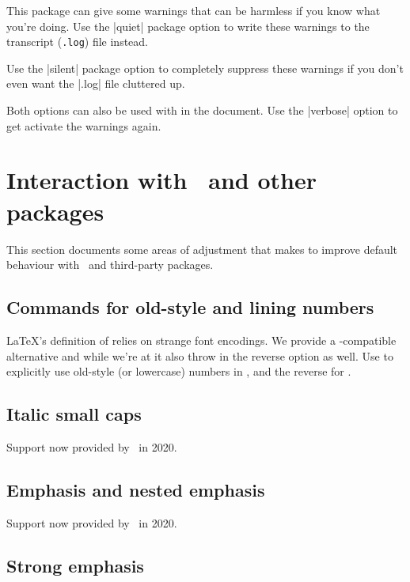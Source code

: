 \documentclass[a4paper]{l3doc}
\begin{document}
This package can give some warnings that can be harmless if you know what
you're doing. Use the  |quiet| package option to write these warnings to the
transcript (\texttt{.log}) file instead.

Use the |silent| package option to completely suppress these warnings if you
don't even want the |.log| file cluttered up.

Both options can also be used with  in the document. Use the  |verbose| option to get activate the warnings again.

\section{Interaction with \LaTeXe\ and other packages}

This section documents some areas of adjustment that  makes
to improve default behaviour with \LaTeXe\ and third-party packages.



\subsection{Commands for old-style and lining numbers}

\DescribeMacro{\oldstylenums}
\DescribeMacro{\liningnums}
\LaTeX's definition of  relies on strange font encodings.
We provide a -compatible alternative and while we're at it
also throw in the reverse option as well. Use 
to explicitly use old-style (or lowercase) numbers in , and
the reverse for .


\subsection{Italic small caps}

Support now provided by \LaTeXe\ in 2020.


\subsection{Emphasis and nested emphasis}

Support now provided by \LaTeXe\ in 2020.


\subsection{Strong emphasis}
\end{document}
